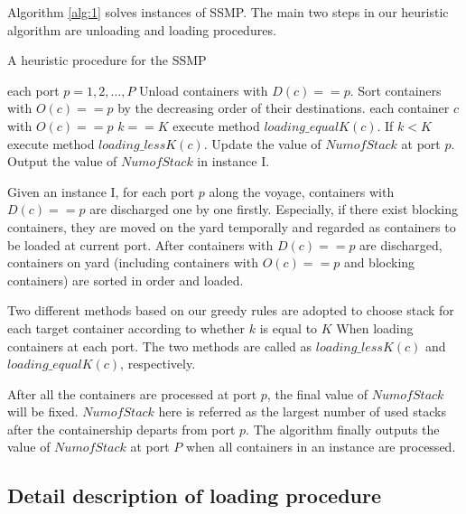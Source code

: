 \documentclass[review,3p,times,authoryear,12pt]{elsarticle}
\begin{document}
Algorithm \ref{alg:1} solves instances of SSMP.
The main two steps in our heuristic algorithm are unloading and loading procedures.

\begin{algorithm}[htbp]
  \caption{A heuristic procedure for the SSMP}
  \label{alg:1}
  \begin{codebox}

    \li \For each port $p=1, 2 , \ldots,P $
    \li \Do
                Unload containers with $D(c)==p$.
    \li         Sort containers with $O(c)==p$ by the decreasing order of their destinations.
    \li         \For each container $c$ with $O(c)==p$
    \li         \Do
                   \If $k==K$
    \li            \Then
                        execute method $loading\_equalK(c)$.
    \li            \Else If $k < K$
    \li                 execute method $loading\_lessK(c)$.
                   \End
                \End
    \li          Update the value of $NumofStack$ at port $p$.
        \End
    \li Output the value of $NumofStack$ in instance I.

 \end{codebox}
 \end{algorithm}

Given an instance I, for each port $p$ along the voyage, containers with $D(c)==p$ are discharged one by one firstly.
Especially, if there exist blocking containers, they are moved on the yard temporally and regarded as containers to be loaded at current port.
After containers with $D(c)==p$ are discharged, containers on yard (including containers with $O(c)==p$ and blocking containers) are sorted in order and loaded.

Two different methods based on our greedy rules are adopted to choose stack for each target container according to whether $k$ is equal to $K$
When loading containers at each port.
The two methods are called as $loading\_lessK(c)$ and $loading\_equalK(c)$, respectively.

After all the containers are processed at port $p$, the final value of $NumofStack$ will be fixed.
$NumofStack$ here is referred as the largest number of used stacks after the containership departs from port $p$.
The algorithm finally outputs the value of $NumofStack$ at port $P$ when all containers in an instance are processed.


\subsection{Detail description of loading procedure}
\label{sec:d2}
\end{document}
